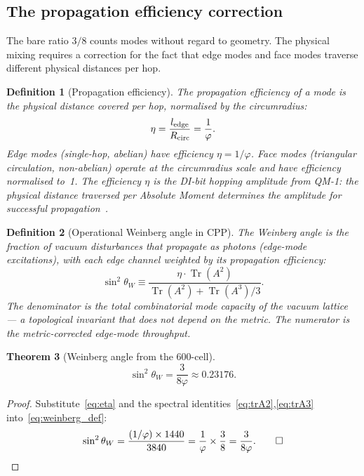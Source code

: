 \documentclass[11pt,letterpaper]{article}
\newtheorem{theorem}{Theorem}[section]
\newtheorem{definition}[theorem]{Definition}
\newcommand{\phig}{\varphi}
\newcommand{\Tr}{\operatorname{Tr}}
\begin{document}
\subsection{The propagation efficiency correction}
The bare ratio $3/8$ counts modes without regard to geometry. The physical mixing requires a correction for the fact that edge modes and face modes traverse different physical distances per hop.

\begin{definition}[Propagation efficiency]
\label{def:eta}
The \emph{propagation efficiency} of a mode is the physical distance covered per hop, normalised by the circumradius:
\begin{equation}
\eta = \frac{l_{\rm edge}}{R_{\rm circ}} = \frac{1}{\phig}.
\label{eq:eta}
\end{equation}
Edge modes (single-hop, abelian) have efficiency $\eta = 1/\phig$. Face modes (triangular circulation, non-abelian) operate at the circumradius scale and have efficiency normalised to~1. The efficiency $\eta$ is the DI-bit hopping amplitude from QM-1: the physical distance traversed per Absolute Moment determines the amplitude for successful propagation~\citep{abshier2026qm1}.
\end{definition}

\begin{definition}[Operational Weinberg angle in CPP]
\label{def:weinberg}
The Weinberg angle is the fraction of vacuum disturbances that propagate as photons (edge-mode excitations), with each edge channel weighted by its propagation efficiency:
\begin{equation}
\sin^2\theta_W \equiv \frac{\eta \cdot \Tr(A^2)}{\Tr(A^2) + \Tr(A^3)/3}.
\label{eq:weinberg_def}
\end{equation}
The denominator is the total combinatorial mode capacity of the vacuum lattice --- a topological invariant that does not depend on the metric. The numerator is the metric-corrected edge-mode throughput.
\end{definition}

\begin{theorem}[Weinberg angle from the 600-cell]
\label{thm:weinberg}
\begin{equation}
\sin^2\theta_W = \frac{3}{8\phig} \approx 0.23176.
\label{eq:sin2tw}
\end{equation}
\end{theorem}
\begin{proof}
Substitute~\eqref{eq:eta} and the spectral identities~\eqref{eq:trA2},\eqref{eq:trA3} into~\eqref{eq:weinberg_def}:
\begin{equation}
\sin^2\theta_W = \frac{(1/\phig) \times 1440}{3840} = \frac{1}{\phig} \times \frac{3}{8} = \frac{3}{8\phig}. \qed
\end{equation}
\end{proof}
\end{document}
